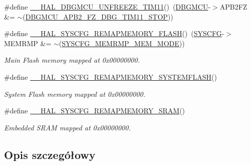 \begin{DoxyCompactItemize}
\item 
\#define \hyperlink{group___h_a_l___exported___macros_gae6396470b3bddff9424201bf07573f19}{\+\_\+\+\_\+\+H\+A\+L\+\_\+\+D\+B\+G\+M\+C\+U\+\_\+\+U\+N\+F\+R\+E\+E\+Z\+E\+\_\+\+T\+I\+M11}()~(\hyperlink{group___peripheral__declaration_ga92ec6d9ec2251fda7d4ce09748cd74b4}{D\+B\+G\+M\+CU}-\/$>$A\+P\+B2\+FZ \&= $\sim$(\hyperlink{group___peripheral___registers___bits___definition_ga354671c942db40e69820fd783ef955b4}{D\+B\+G\+M\+C\+U\+\_\+\+A\+P\+B2\+\_\+\+F\+Z\+\_\+\+D\+B\+G\+\_\+\+T\+I\+M11\+\_\+\+S\+T\+OP}))
\item 
\#define \hyperlink{group___h_a_l___exported___macros_ga9500619e1ec21659bd32b1dfecd5afc1}{\+\_\+\+\_\+\+H\+A\+L\+\_\+\+S\+Y\+S\+C\+F\+G\+\_\+\+R\+E\+M\+A\+P\+M\+E\+M\+O\+R\+Y\+\_\+\+F\+L\+A\+SH}()~(\hyperlink{group___peripheral__declaration_ga3c833fe1c486cb62250ccbca32899cb8}{S\+Y\+S\+C\+FG}-\/$>$M\+E\+M\+R\+MP \&= $\sim$(\hyperlink{group___peripheral___registers___bits___definition_ga3c05039ec67573c00da29f58b914f258}{S\+Y\+S\+C\+F\+G\+\_\+\+M\+E\+M\+R\+M\+P\+\_\+\+M\+E\+M\+\_\+\+M\+O\+DE}))
\begin{DoxyCompactList}\small\item\em Main Flash memory mapped at 0x00000000. \end{DoxyCompactList}\item 
\#define \hyperlink{group___h_a_l___exported___macros_ga59782d94690fd538b25def536c81c3ed}{\+\_\+\+\_\+\+H\+A\+L\+\_\+\+S\+Y\+S\+C\+F\+G\+\_\+\+R\+E\+M\+A\+P\+M\+E\+M\+O\+R\+Y\+\_\+\+S\+Y\+S\+T\+E\+M\+F\+L\+A\+SH}()
\begin{DoxyCompactList}\small\item\em System Flash memory mapped at 0x00000000. \end{DoxyCompactList}\item 
\#define \hyperlink{group___h_a_l___exported___macros_ga86d36fdb1571fd56ffeecfaed80c6805}{\+\_\+\+\_\+\+H\+A\+L\+\_\+\+S\+Y\+S\+C\+F\+G\+\_\+\+R\+E\+M\+A\+P\+M\+E\+M\+O\+R\+Y\+\_\+\+S\+R\+AM}()
\begin{DoxyCompactList}\small\item\em Embedded S\+R\+AM mapped at 0x00000000. \end{DoxyCompactList}\end{DoxyCompactItemize}


\subsection{Opis szczegółowy}


